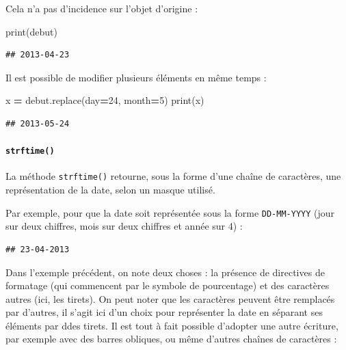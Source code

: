 \documentclass[12pt,]{book}
\newenvironment{Shaded}{\begin{snugshade}}{\end{snugshade}}
\newcommand{\DecValTok}[1]{\textcolor[rgb]{0.00,0.00,0.81}{#1}}
\newcommand{\SpecialCharTok}[1]{\textcolor[rgb]{0.00,0.00,0.00}{#1}}
\newcommand{\StringTok}[1]{\textcolor[rgb]{0.31,0.60,0.02}{#1}}
\newcommand{\OperatorTok}[1]{\textcolor[rgb]{0.81,0.36,0.00}{\textbf{#1}}}
\newcommand{\BuiltInTok}[1]{#1}
\newcommand{\NormalTok}[1]{#1}
\let\oldparagraph\paragraph
\renewcommand{\paragraph}[1]{\oldparagraph{#1}\mbox{}}
\numberwithin{equation}{section}
\numberwithin{countremarque}{section}
\begin{document}
Cela n'a pas d'incidence sur l'objet d'origine :

\begin{Shaded}
\begin{Highlighting}[]
\BuiltInTok{print}\NormalTok{(debut)}
\end{Highlighting}
\end{Shaded}

\begin{lstlisting}
## 2013-04-23
\end{lstlisting}

Il est possible de modifier plusieurs éléments en même temps :

\begin{Shaded}
\begin{Highlighting}[]
\NormalTok{x }\OperatorTok{=}\NormalTok{ debut.replace(day}\OperatorTok{=}\DecValTok{24}\NormalTok{, month}\OperatorTok{=}\DecValTok{5}\NormalTok{)}
\BuiltInTok{print}\NormalTok{(x)}
\end{Highlighting}
\end{Shaded}

\begin{lstlisting}
## 2013-05-24
\end{lstlisting}

\paragraph{\texorpdfstring{\texttt{strftime()}}{strftime()}}\label{strftime}

La méthode \texttt{strftime()} retourne, sous la forme d'une chaîne de
caractères, une représentation de la date, selon un masque utilisé.

Par exemple, pour que la date soit représentée sous la forme
\texttt{DD-MM-YYYY} (jour sur deux chiffres, mois sur deux chiffres et
année sur 4) :

\begin{Shaded}
\end{Shaded}

\begin{lstlisting}
## 23-04-2013
\end{lstlisting}

Dans l'exemple précédent, on note deux choses : la présence de
directives de formatage (qui commencent par le symbole de pourcentage)
et des caractères autres (ici, les tirets). On peut noter que les
caractères peuvent être remplacés par d'autres, il s'agit ici d'un choix
pour représenter la date en séparant ses éléments par ddes tirets. Il
est tout à fait possible d'adopter une autre écriture, par exemple avec
des barres obliques, ou même d'autres chaînes de caractères :
\end{document}
